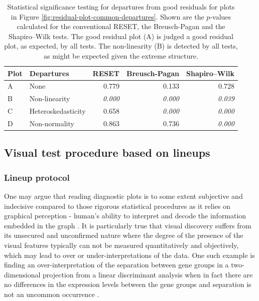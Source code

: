\documentclass[]{interact}
\theoremstyle{plain}%
\theoremstyle{definition}
\theoremstyle{remark}
\begin{document}
\begin{table}

\caption{\label{tab:example-residual-plot-table}Statistical significance testing for departures from good residuals for plots in Figure \ref{fig:residual-plot-common-departures}. Shown are the $p$-values calculated for the conventional RESET, the Breusch-Pagan and the Shapiro–Wilk tests. The good residual plot (A) is judged a good residual plot, as expected, by all tests. The non-linearity (B) is detected by all tests, as might be expected given the extreme structure.}
\centering
\begin{tabular}[t]{llrrr}
\toprule
Plot & Departures & RESET & Breusch-Pagan & Shapiro–Wilk\\
\midrule
A & None & 0.779 & 0.133 & 0.728\\
B & Non-linearity & \em{0.000} & \em{0.000} & \em{0.039}\\
C & Heteroskedasticity & 0.658 & \em{0.000} & \em{0.000}\\
D & Non-normality & 0.863 & 0.736 & \em{0.000}\\
\bottomrule
\end{tabular}
\end{table}

\hypertarget{visual-test-procedure-based-on-lineups}{%
\subsection{Visual test procedure based on
lineups}\label{visual-test-procedure-based-on-lineups}}

\hypertarget{lineup-protocol}{%
\subsubsection{Lineup protocol}\label{lineup-protocol}}

One may argue that reading diagnostic plots is to some extent subjective
and indecisive compared to those rigorous statistical procedures as it
relies on graphical perception - human's ability to interpret and decode
the information embedded in the graph \citep{cleveland_graphical_1984}.
It is particularly true that visual discovery suffers from its unsecured
and unconfirmed nature where the degree of the presence of the visual
features typically can not be measured quantitatively and objectively,
which may lead to over or under-interpretations of the data. One such
example is finding an over-interpretation of the separation between gene
groups in a two-dimensional projection from a linear discriminant
analysis when in fact there are no differences in the expression levels
between the gene groups and separation is not an uncommon occurrence
\citep{roy_chowdhury_using_2015}.
\end{document}
